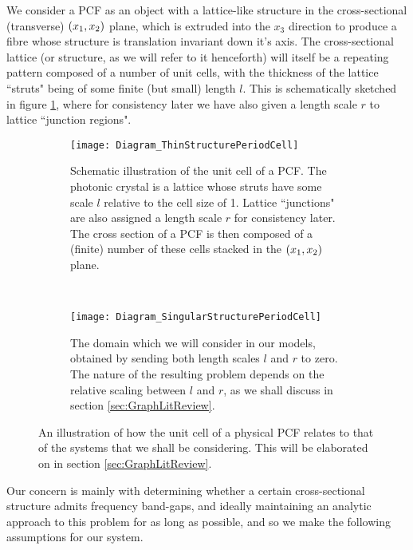 We consider a PCF as an object with a lattice-like structure in the cross-sectional (transverse) $\left( x_1,x_2 \right)$ plane, which is extruded into the $x_3$ direction to produce a fibre whose structure is translation invariant down it's axis.
The cross-sectional lattice (or structure, as we will refer to it henceforth) will itself be a repeating pattern composed of a number of unit cells, with the thickness of the lattice ``struts" being of some finite (but small) length $l$.
This is schematically sketched in figure \ref{fig:Diagram_ThinStructurePeriodCell}, where for consistency later we have also given a length scale $r$ to lattice ``junction regions".
\begin{figure}[b!]
	\centering
	\begin{subfigure}[t]{0.45\textwidth}
		\centering
		\texttt{[image: Diagram\_ThinStructurePeriodCell]}
		\caption{\label{fig:Diagram_ThinStructurePeriodCell} Schematic illustration of the unit cell of a PCF. The photonic crystal is a lattice whose struts have some scale $l$ relative to the cell size of 1. Lattice ``junctions" are also assigned a length scale $r$ for consistency later. The cross section of a PCF is then composed of a (finite) number of these cells stacked in the $\left( x_1,x_2 \right)$ plane.}
	\end{subfigure}
	~
	\begin{subfigure}[t]{0.45\textwidth}
		\centering
		\texttt{[image: Diagram\_SingularStructurePeriodCell]}
		\caption{\label{fig:Diagram_SingularStructurePeriodCell} The domain which we will consider in our models, obtained by sending both length scales $l$ and $r$ to zero. The nature of the resulting problem depends on the relative scaling between $l$ and $r$, as we shall discuss in section \ref{sec:GraphLitReview}.}
	\end{subfigure}
	\caption{\label{fig:ThinToSingularStructure} An illustration of how the unit cell of a physical PCF relates to that of the systems that we shall be considering. This will be elaborated on in section \ref{sec:GraphLitReview}.}
\end{figure}
Our concern is mainly with determining whether a certain cross-sectional structure admits frequency band-gaps, and ideally maintaining an analytic approach to this problem for as long as possible, and so we make the following assumptions for our system.

